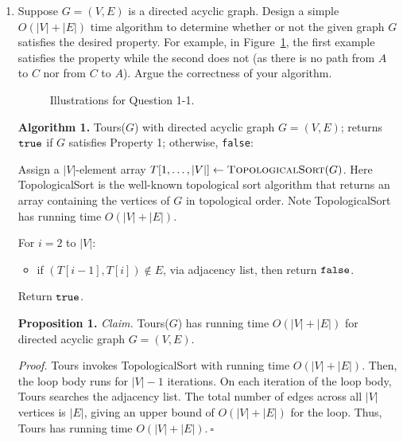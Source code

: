 \begin{enumerate}
\item Suppose $G = (V, E)$ is a directed acyclic graph. Design a simple $O(|V|+|E|)$ time algorithm to determine whether or not the given graph $G$ satisfies the desired property. For example, in Figure~\ref{fig:q1-1}, the first example satisfies the property while the second does not (as there is no path from $A$ to $C$ nor from $C$ to $A$).
Argue the correctness of your algorithm.
\begin{figure}[htb]
    \centering
    \caption{Illustrations for Question 1-1.}
    \label{fig:q1-1}
\end{figure}
\begin{solution}

\textbf{Algorithm 1. }{\sc Tours}($G$) with directed acyclic graph $G=(V,E)$; returns $\verb|true|$ if $G$ satisfies Property 1; otherwise, \verb|false|:

Assign a $|V|$-element array $T[1,\dots,|V|]\leftarrow\textsc{TopologicalSort}(G)$. Here {\sc TopologicalSort} is the well-known topological sort algorithm that returns an array containing the vertices of $G$ in topological order. Note {\sc TopologicalSort} has running time $O(|V|+|E|)$.

For $i=2$ to $|V|$:
\begin{itemize}
    \item if $(T[i-1],T[i])\notin E$, via adjacency list, then return $\verb|false|$.
\end{itemize}
Return $\verb|true|$.

\textbf{Proposition 1. }\textit{Claim. }{\sc Tours}($G$) has running time $O(|V|+|E|)$ for directed acyclic graph $G=(V,E)$.

\textit{Proof. }{\sc Tours} invokes {\sc TopologicalSort} with running time $O(|V|+|E|)$. Then, the loop body runs for $|V|-1$ iterations. On each iteration of the loop body, {\sc Tours} searches the adjacency list. The total number of edges across all $|V|$ vertices is $|E|$, giving an upper bound of $O(|V|+|E|)$ for the loop. Thus, {\sc Tours} has running time $O(|V|+|E|).~\square$


\end{solution}
\end{enumerate}

